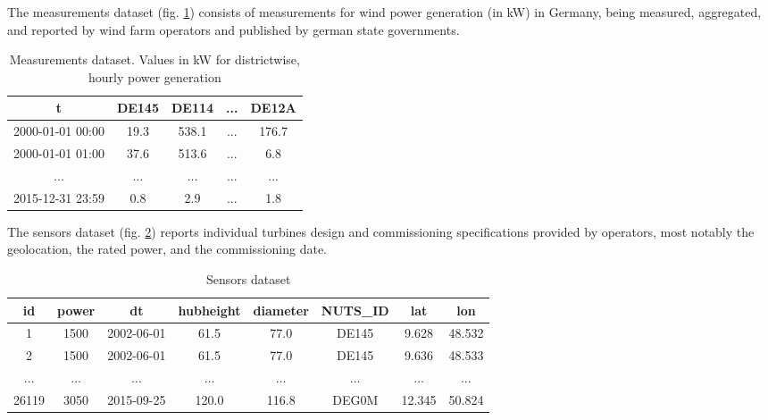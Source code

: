 The measurements dataset (fig. \ref{table:measurements-dataset}) consists of measurements for wind power generation (in kW) in Germany, being measured, aggregated, and reported by wind farm operators and published by german state governments.

\begin{table}[H]
\centering
\caption{Measurements dataset. Values in kW for districtwise, hourly power generation} \label{table:measurements-dataset}
\begin{tabular}{lcccc}
\hline
\multicolumn{1}{c}{t}   & DE145 & DE114 & ... & DE12A \\ \hline
2000-01-01 00:00        & 19.3  & 538.1 & ... & 176.7 \\
2000-01-01 01:00        & 37.6  & 513.6 & ... & 6.8   \\
\multicolumn{1}{c}{...} & ...   & ...   & ... & ...   \\
2015-12-31 23:59        & 0.8   & 2.9   & ... & 1.8   \\ \hline
\end{tabular}
\end{table}

The sensors dataset (fig. \ref{table:sensors-dataset}) reports individual turbines design and commissioning specifications provided by operators, most notably the geolocation, the rated power, and the commissioning date.

\begin{table}[]
\centering
\caption{Sensors dataset} \label{table:sensors-dataset}
\begin{tabular}{cccccccc}
\hline
\textbf{id} & \textbf{power} & \textbf{dt} & \textbf{hubheight} & \textbf{diameter} & \textbf{NUTS\_ID}& \textbf{lat} & \textbf{lon} \\ \hline
1                            & 1500                            & 2002-06-01                   & 61.5                                & 77.0                               & DE145                              & 9.628                         & 48.532                        \\
2                            & 1500                            & 2002-06-01                   & 61.5                                & 77.0                               & DE145                              & 9.636                         & 48.533                        \\
$\dots$                      & $\dots$                         & $\dots$                      & $\dots$                             & $\dots$                            & $\dots$                            & $\dots$                       & $\dots$                       \\
26119                        & 3050                            & 2015-09-25                   & 120.0                               & 116.8                              & DEG0M                              & 12.345                        & 50.824                        \\ \hline
\end{tabular}
\end{table}

